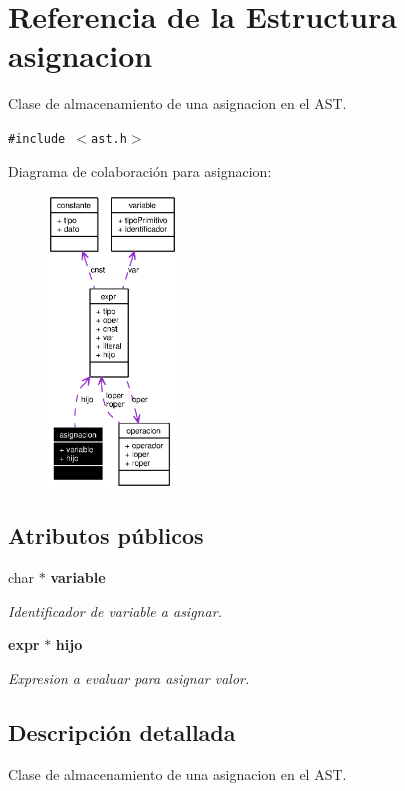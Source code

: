 \section{Referencia de la Estructura asignacion}
\label{structasignacion}
Clase de almacenamiento de una asignacion en el AST.  


{\tt \#include $<$ast.h$>$}

Diagrama de colaboraci\'{o}n para asignacion:\begin{figure}[H]
\begin{center}
\leavevmode
\includegraphics[width=97pt]{structasignacion__coll__graph}
\end{center}
\end{figure}
\subsection*{Atributos p\'{u}blicos}
\begin{CompactItemize}
\item 
char $\ast$ {\bf variable}
\begin{CompactList}\small\item\em Identificador de variable a asignar. \item\end{CompactList}\item 
{\bf expr} $\ast$ {\bf hijo}
\begin{CompactList}\small\item\em Expresion a evaluar para asignar valor. \item\end{CompactList}\end{CompactItemize}


\subsection{Descripci\'{o}n detallada}
Clase de almacenamiento de una asignacion en el AST. 



